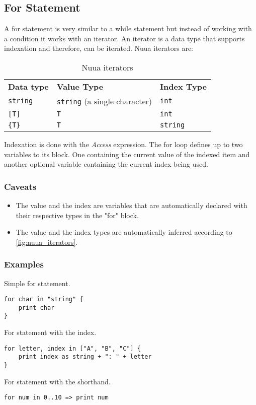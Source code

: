 \subsection{For Statement}

A for statement is very similar to a while statement but instead of working with a condition it works with an iterator.
An iterator is a data type that supports indexation and therefore, can be iterated. Nuua iterators are:

\begin{table}[H]
    \centering
    \begin{tabular}{ l l l }
        \textbf{Data type} & \textbf{Value Type} & \textbf{Index Type} \\
        \texttt{string} & \texttt{string} (a single character) & \texttt{int} \\
        \texttt{[T]}& \texttt{T} & \texttt{int} \\
        \texttt{\{T\}} & \texttt{T} & \texttt{string} \\
    \end{tabular}
    \caption{Nuua iterators}
    \label{fig:nuua_iterators}
\end{table}

Indexation is done with the \emph{Access} expression.
The for loop defines up to two variables to its block. One containing the current value of the indexed item and
another optional variable containing the current index being used.

\subsubsection{Caveats}

\begin{itemize}
    \item The value and the index are variables that are automatically declared with their respective types in the "for" block.
    \item The value and the index types are automatically inferred according to \autoref{fig:nuua_iterators}.
\end{itemize}

\subsubsection{Examples}

Simple for statement.
\begin{lstlisting}
for char in "string" {
    print char
}
\end{lstlisting}
For statement with the index.
\begin{lstlisting}
for letter, index in ["A", "B", "C"] {
    print index as string + ": " + letter
}
\end{lstlisting}
For statement with the shorthand.
\begin{lstlisting}
for num in 0..10 => print num
\end{lstlisting}

